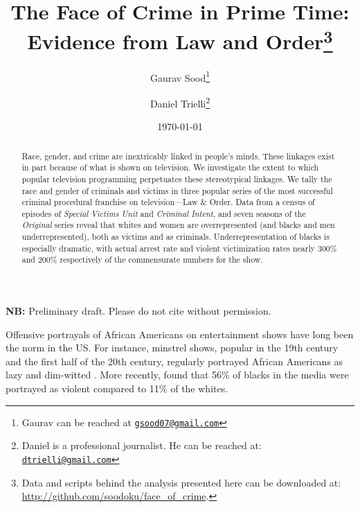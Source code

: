 \documentclass[12pt, letterpaper]{article}
\title{\Large{The Face of Crime in Prime Time:\\ Evidence from Law and Order}\footnote{Data and scripts behind the analysis presented here can be downloaded at: \url{http://github.com/soodoku/face_of_crime}.}}
\author{Gaurav Sood\thanks{Gaurav can be reached at \href{mailto:gsood07@gmail.com}{\footnotesize{\texttt{gsood07@gmail.com}}}} \and Daniel Trielli\thanks{Daniel is a professional journalist. He can be reached at: \href{mailto:dtrielli@gmail.com}{\footnotesize{\texttt{dtrielli@gmail.com}}}}\vspace{.5cm}}
\date{\vspace{.5cm}\normalsize{\today}}
\begin{document}
\maketitle

\begin{center}
\vspace{.5cm}\textbf{NB:} Preliminary draft. Please do not cite without permission.\vspace{1.5cm}
\end{center}

\begin{abstract}
\noindent Race, gender, and crime are inextricably linked in people's minds. These linkages exist in part because of what is shown on television. We investigate the extent to which popular television programming perpetuates these stereotypical linkages. We tally the race and gender of criminals and victims in three popular series of the most successful criminal procedural franchise on television---Law \& Order. Data from a census of episodes of \textit{Special Victims Unit} and \textit{Criminal Intent}, and seven seasons of the \textit{Original} series reveal that whites and women are overrepresented (and blacks and men underrepresented), both as victims and as criminals. Underrepresentation of blacks is especially dramatic, with actual arrest rate and violent victimization rates nearly 300\% and 200\% respectively of the commensurate numbers for the show. 
\end{abstract}
\clearpage
\doublespace

Offensive portrayals of African Americans on entertainment shows have long been the norm in the US. For instance, minstrel shows, popular in the 19th century and the first half of the 20th century, regularly portrayed African Americans as lazy and dim-witted \citep{dates1993split, toll1974blacking}. More recently, \citet{entman2001black} found that 56\% of blacks in the media were portrayed as violent compared to 11\% of the whites.
\end{document}
